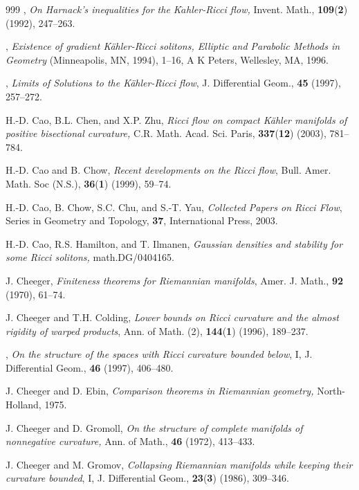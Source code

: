 \begin{thebibliography}{999}
 \bysame,
{\it On Harnack's inequalities for the K$\ddot{a}$hler-Ricci
flow,} Invent. Math., \textbf{109}({\bf 2}) (1992), 247--263.

 \bysame,
{\it Existence of gradient K\"{a}hler-Ricci solitons, Elliptic and
Parabolic Methods in Geometry} (Minneapolis, MN, 1994), 1--16, A K
Peters, Wellesley, MA, 1996.

 \bysame,
{\it Limits of Solutions to the K\"{a}hler-Ricci flow}, J.
Differential Geom., \textbf{45 } (1997), 257--272.

H.-D. Cao, B.L. Chen, and X.P. Zhu,
{\it Ricci flow on compact K\"{a}hler manifolds of positive
bisectional curvature,} C.R. Math. Acad. Sci. Paris,
\textbf{337}({\bf 12}) (2003), 781--784.

H.-D. Cao and B. Chow,
{\it Recent developments on the Ricci flow}, Bull. Amer. Math. Soc
(N.S.), {\bf 36}({\bf 1}) (1999), 59--74.

H.-D. Cao, B. Chow, S.C. Chu,  and S.-T. Yau,
{\it Collected Papers on Ricci Flow}, Series in Geometry and
Topology, \textbf{37}, International Press, 2003.

 H.-D. Cao, R.S. Hamilton, and T. Ilmanen,
{\it Gaussian densities and stability for some Ricci solitons,}
math.DG/0404165.

J. Cheeger,
{\it Finiteness theorems for Riemannian manifolds}, Amer. J.
Math., \textbf{92} (1970), 61--74.

J. Cheeger and T.H. Colding,
{\it Lower bounds on Ricci curvature and the almost rigidity of
warped products}, Ann. of Math. (2), \textbf{144}({\bf 1}) (1996),
189--237.

 \bysame,
{\it On the structure of the spaces with Ricci curvature bounded
below}, I, J. Differential Geom., {\bf 46} (1997), 406--480.

 J. Cheeger and D. Ebin,
{\it Comparison theorems in Riemannian geometry,} North-Holland,
1975.

 J. Cheeger and D. Gromoll,
{\it On the structure of complete manifolds of nonnegative
curvature,} Ann. of Math., \textbf{46} (1972), 413--433.

J. Cheeger and M. Gromov,
{\it Collapsing Riemannian manifolds while keeping their curvature
bounded}, I, J. Differential Geom., \textbf{23}({\bf 3}) (1986),
309--346.


\end{thebibliography}
